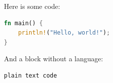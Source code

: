 Here is some code:

\begin{lstlisting}[language=rust]
fn main() {
    println!("Hello, world!");
}
\end{lstlisting}
And a block without a language:

\begin{verbatim}
plain text code
\end{verbatim}
